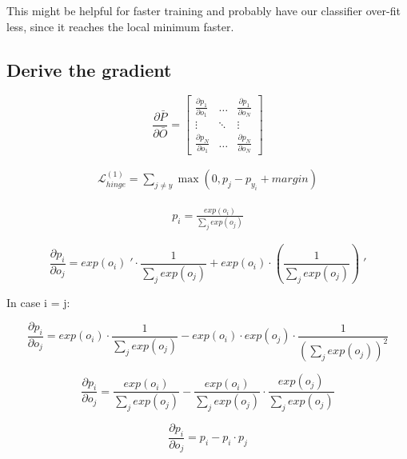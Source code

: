 \documentclass[a4paper]{article}
\begin{document}
This might be helpful for faster training and probably have our classifier over-fit less, since it reaches the local minimum faster.

\subsection{Derive the gradient}

\begin{equation}
\frac{\partial \bar P}{\partial \bar O} = \begin{bmatrix} \frac{\partial p_1}{\partial o_1} & \dots & \frac{\partial p_1}{\partial o_N} \\ \vdots & \ddots & \vdots \\ \frac{\partial p_N}{\partial o_1} & \dots &	\frac{\partial p_N}{\partial o_N} \end{bmatrix}
\nonumber\end{equation}

\begin{gather}\mathcal{L}_{hinge}^{(1)} = \sum \limits_{j \neq y} \max (0, p_j -  p_{y_i} + margin)\nonumber \end{gather}

\begin{gather} p_i = \frac {exp(o_i)} {\sum \limits_{j} exp(o_j)}\nonumber \end{gather}

\begin{equation}
\frac{\partial p_i}{\partial o_j} = exp(o_i)\;' \cdot \frac{1}{\sum \limits_{j} exp(o_j)} + exp(o_i) \cdot (\frac{1}{\sum \limits_{j} exp(o_j)})\;'
\end{equation}

In case i = j:

\begin{equation}
\frac{\partial p_i}{\partial o_j} = exp(o_i) \cdot \frac{1}{\sum \limits_{j} exp(o_j)} - exp(o_i)\cdot exp(o_j) \cdot \frac{1}{{(\sum \limits_{j} exp(o_j))}^2}
\nonumber\end{equation}

\begin{equation}
\frac{\partial p_i}{\partial o_j} = \frac {exp(o_i)} {{\sum \limits_{j} exp(o_j)}} - \frac {exp(o_i)}{\sum \limits_{j} exp(o_j)} \cdot \frac{exp(o_j)}{\sum \limits_{j} exp(o_j)}
\nonumber\end{equation}

\begin{equation}
\frac{\partial p_i}{\partial o_j} = p_i - p_i \cdot p_j
\nonumber\end{equation}
\end{document}
